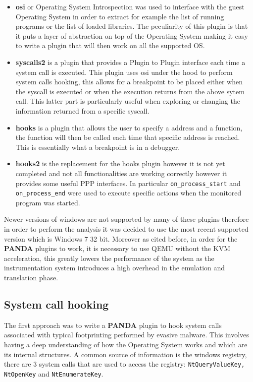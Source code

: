 \begin{itemize}
    \item \textbf{osi} or Operating System Introspection was used to interface with the guest Operating System in order to extract for example the list of running programs or the list of loaded libraries. The peculiarity of this plugin is that it puts a layer of abstraction on top of the Operating System making it easy to write a plugin that will then work on all the supported OS.
    
    \item \textbf{syscalls2} is a plugin that provides a Plugin to Plugin interface each time a system call is executed. This plugin uses osi under the hood to perform system calls hooking, this allows for a breakpoint to be placed either when the syscall is executed or when the execution returns from the above sytem call. This latter part is particularly useful when exploring or changing the information returned from a specific syscall.
    
    \item \textbf{hooks} is a plugin that allows the user to specify a address and a function, the function will then be called each time that specific address is reached. This is essentially what a breakpoint is in a debugger.
    
    \item \textbf{hooks2} is the replacement for the hooks plugin however it is not yet completed and not all functionalities are working correctly however it provides some useful PPP interfaces. In particular \lstinline{on_process_start} and \lstinline{on_process_end} were used to execute specific actions when the monitored program was started.
\end{itemize}

Newer versions of windows are not supported by many of these plugins therefore in order to perform the analysis it was decided to use the most recent supported version which is Windows 7 32 bit.
Moreover as cited before, in order for the \textbf{PANDA} plugins to work, it is necessary to use QEMU without the KVM acceleration, this greatly lowers the performance of the system as the instrumentation system introduces a high overhead in the emulation and translation phase. 

\subsection{System call hooking}

The first approach was to write a \textbf{PANDA} plugin to hook system calls associated with typical footprinting performed by evasive malware. This involves having a deep understanding of how the Operating System works and which are its internal structures. A common source of information is the windows registry, there are 3 system calls that are used to access the registry: \lstinline{NtQueryValueKey, NtOpenKey} and \lstinline{NtEnumerateKey}. 

